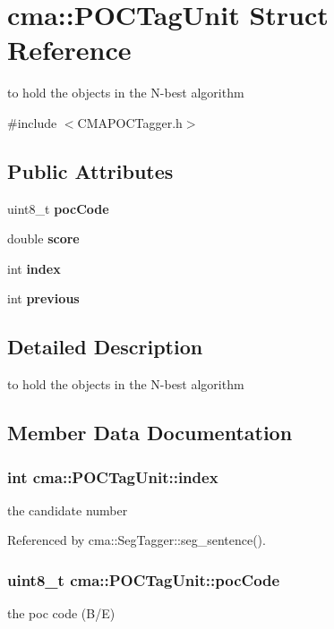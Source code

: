 \section{cma::POCTagUnit Struct Reference}
\label{structcma_1_1POCTagUnit}


to hold the objects in the N-\/best algorithm  


{\ttfamily \#include $<$CMAPOCTagger.h$>$}\subsection*{Public Attributes}
\begin{DoxyCompactItemize}
\item 
uint8\_\-t {\bf pocCode}
\item 
double {\bf score}
\item 
int {\bf index}
\item 
int {\bf previous}
\end{DoxyCompactItemize}


\subsection{Detailed Description}
to hold the objects in the N-\/best algorithm 

\subsection{Member Data Documentation}
\subsubsection[{index}]{\setlength{\rightskip}{0pt plus 5cm}int {\bf cma::POCTagUnit::index}}\label{structcma_1_1POCTagUnit_a408429985543c203e36a6e8c6921935c}
the candidate number 

Referenced by cma::SegTagger::seg\_\-sentence().
\subsubsection[{pocCode}]{\setlength{\rightskip}{0pt plus 5cm}uint8\_\-t {\bf cma::POCTagUnit::pocCode}}\label{structcma_1_1POCTagUnit_aa4a0e15baeb1ad18bbe2103284d5edb9}
the poc code (B/E) 

